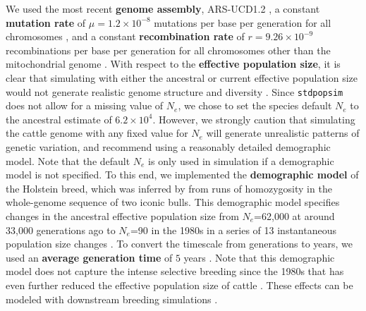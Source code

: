 \documentclass[hidelinks]{article}
\newcommand{\stdpopsim}{\texttt{stdpopsim}\xspace}
\begin{document}
We used the most recent \textbf{genome assembly}, ARS-UCD1.2
\citep{Rosen2020}, a constant \textbf{mutation rate} of
$\mu=1.2\times 10^{-8}$ mutations per base per generation
for all chromosomes \citep{Harland2017}, 
and a constant \textbf{recombination rate} of
$r=9.26 \times 10^{-9}$ recombinations per base per generation for all chromosomes other than the mitochondrial genome \citep{Ma2015}.
With respect to the \textbf{effective population size}, it is clear that simulating with either 
the ancestral or current effective population size would not generate realistic genome structure and diversity \citep{MacLeod2013,Rosen2020}.
Since \stdpopsim  does not allow for a missing value of $N_e$,
we chose to set the species default $N_e$ to the ancestral estimate of $6.2\times 10^4$.
However, we strongly caution that
simulating the cattle genome with any fixed value for $N_e$ will generate unrealistic patterns of genetic variation,
and recommend using a reasonably detailed demographic model.
Note that the default $N_e$ is only used in simulation if a demographic model is not specified.
To this end, 
we implemented the \textbf{demographic model} of the Holstein breed, which was
inferred by \cite{MacLeod2013} from runs of homozygosity in the whole-genome sequence of two iconic bulls.
This demographic model specifies changes in the ancestral effective population size from $N_e$=62,000 at around 33,000 generations ago to $N_e$=90 in the 1980s
in a series of 13 instantaneous population size changes
\citep[taken from Supplementary Table S1 in][]{MacLeod2013}.
To convert the timescale from generations to years, we used an \textbf{average generation time} of $5$ years \citep{MacLeod2013}.
Note that this demographic model does not capture the intense selective breeding since the 1980s that has even further reduced the effective population size of cattle \citep{MacLeod2013, VanRaden2020, Makanjouloa2020}. These effects can be modeled with
downstream breeding simulations \citep[e.g.,][]{Gaynor2020}.
\end{document}
